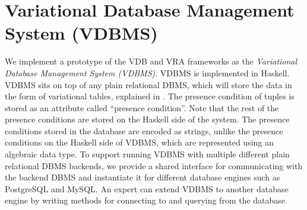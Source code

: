 \chapter{Variational Database Management System (VDBMS)}
\label{ch:vdbms}

%
We implement a prototype of the VDB and VRA frameworks as the
\emph{Variational Database Management System (VDBMS)}.
VDBMS is implemented in Haskell. VDBMS sits on 
top of any plain relational DBMS, which will store the data 
in the form of variational tables, explained in . The presence condition
of tuples is stored as an attribute called ``presence condition''.
Note that the rest of the presence conditions are stored on the Haskell side of the system.
The presence conditions stored in the database are encoded as strings, unlike 
the presence conditions on the Haskell side of VDBMS, which are represented using
an algebraic data type.
To support running VDBMS with multiple different plain relational DBMS backends,
we provide
a shared interface
for communicating with the backend DBMS and
instantiate it for different database engines such as PostgreSQL and
MySQL. 
An expert can extend VDBMS to another database engine by
writing methods for connecting to and querying from the database.

%

%




